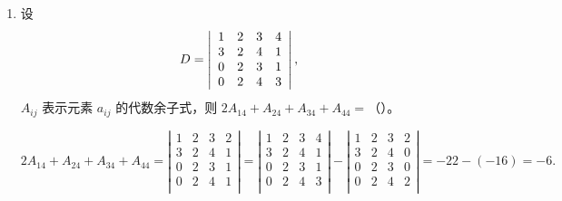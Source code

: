\begin{enumerate}[1~]
\begin{enumerate}[1.~]
\item
设
$$
D = \left| \begin{array} { c c c c } { 1 } & { 2 } & { 3 } & { 4 } \\ { 3 } & { 2 } & { 4 } & { 1 } \\ { 0 } & { 2 } & { 3 } & { 1 } \\ { 0 } & { 2 } & { 4 } & { 3 } \end{array} \right|,
$$
$A_{ij}$ 表示元素 $a_{ij}$ 的代数余子式，则 $2A_{14} + A_{24} + A_{34} + A_{44} = $（\quad）。
\begin{solution}
$2A_{14} + A_{24} + A_{34} + A_{44} = \left| \begin{matrix}
	1&		2&		3&		2\\
	3&		2&		4&		1\\
	0&		2&		3&		1\\
	0&		2&		4&		1\\
\end{matrix} \right|=\left| \begin{matrix}
	1&		2&		3&		4\\
	3&		2&		4&		1\\
	0&		2&		3&		1\\
	0&		2&		4&		3\\
\end{matrix} \right|-\left| \begin{matrix}
	1&		2&		3&		2\\
	3&		2&		4&		0\\
	0&		2&		3&		0\\
	0&		2&		4&		2\\
\end{matrix} \right|=-22-(-16)=-6.$
\end{solution}


\end{enumerate}
\end{enumerate}
